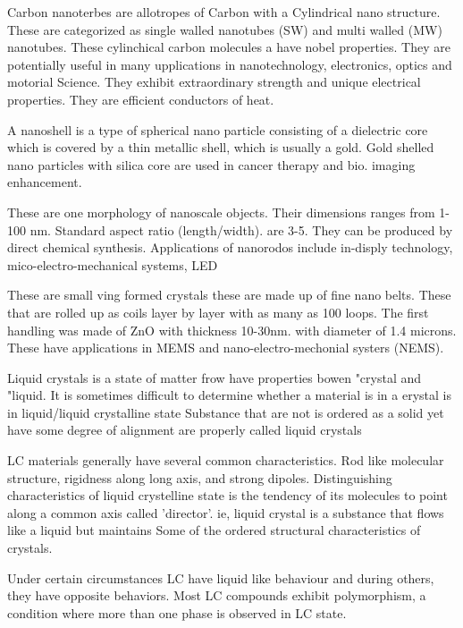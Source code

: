 \documentclass[12pt, a4paper]{article}
\begin{document}
Carbon nanoterbes are allotropes of Carbon with a Cylindrical nano structure. These are categorized as single walled nanotubes (SW) and multi walled (MW) nanotubes. These cylinchical carbon molecules a have nobel properties. They are potentially useful in many upplications in nanotechnology, electronics, optics and motorial Science. They exhibit extraordinary strength and unique electrical properties. They are efficient conductors of heat.

A nanoshell is a type of spherical nano particle consisting of a dielectric core which is covered by a thin metallic shell, which is usually a gold. Gold shelled nano particles with silica core are used in cancer therapy and bio. imaging enhancement.

These are one morphology of nanoscale objects. Their dimensions ranges from 1-100 nm. Standard aspect ratio (length/width). are 3-5. They can be produced by direct chemical synthesis. Applications of nanorodos include in-disply technology, mico-electro-mechanical systems, LED

These are small ving formed crystals these are made up of fine nano belts. These that are rolled up as coils layer by layer with as many as 100 loops. The first handling was made of ZnO with thickness 10-30nm. with diameter of 1.4 microns. These have applications in MEMS and nano-electro-mechonial systers (NEMS).

Liquid crystals is a state of matter frow have properties bowen "crystal and "liquid. It is sometimes difficult to determine whether a material is in a erystal is in liquid/liquid crystalline state Substance that are not is ordered as a solid yet have some degree of alignment are properly called liquid crystals

LC materials generally have several common characteristics. Rod like molecular structure, rigidness along long axis, and strong dipoles. Distinguishing characteristics of liquid crystelline state is the tendency of its molecules to point along a common axis called 'director'. ie, liquid crystal is a substance that flows like a liquid but maintains Some of the ordered structural characteristics of crystals.

Under certain circumstances LC have liquid like behaviour and during others, they have opposite behaviors. Most LC compounds exhibit polymorphism, a condition where more than one phase is observed in LC state.
\end{document}
